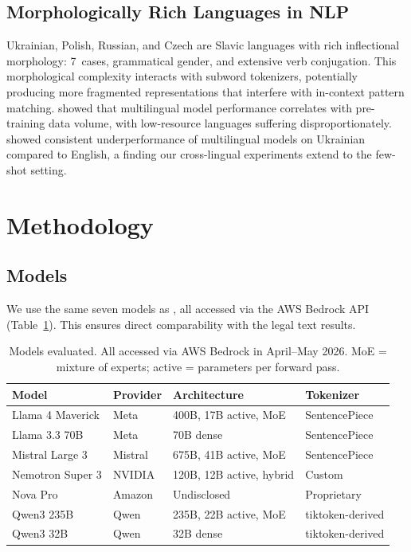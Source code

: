 \documentclass[11pt,a4paper]{article}
\begin{document}
\subsection{Morphologically Rich Languages in NLP}

Ukrainian, Polish, Russian, and Czech are Slavic languages with rich inflectional morphology: 7~cases, grammatical gender, and extensive verb conjugation. This morphological complexity interacts with subword tokenizers, potentially producing more fragmented representations that interfere with in-context pattern matching. \citet{conneau2020unsupervised} showed that multilingual model performance correlates with pre-training data volume, with low-resource languages suffering disproportionately. \citet{chaplynskyi2023ukrbruk} showed consistent underperformance of multilingual models on Ukrainian compared to English, a finding our cross-lingual experiments extend to the few-shot setting.

\section{Methodology}

\subsection{Models}

We use the same seven models as \citet{ovcharov2026tokenizer}, all accessed via the AWS Bedrock API (Table~\ref{tab:models}). This ensures direct comparability with the legal text results.

\begin{table}[t]
\centering
\caption{Models evaluated. All accessed via AWS Bedrock in April--May 2026. MoE = mixture of experts; active = parameters per forward pass.}
\label{tab:models}
\begin{tabular}{llll}
\toprule
\textbf{Model} & \textbf{Provider} & \textbf{Architecture} & \textbf{Tokenizer} \\
\midrule
Llama 4 Maverick   & Meta      & 400B, 17B active, MoE & SentencePiece \\
Llama 3.3 70B      & Meta      & 70B dense              & SentencePiece \\
Mistral Large 3    & Mistral   & 675B, 41B active, MoE  & SentencePiece \\
Nemotron Super 3   & NVIDIA    & 120B, 12B active, hybrid & Custom \\
Nova Pro           & Amazon    & Undisclosed            & Proprietary \\
Qwen3 235B         & Qwen      & 235B, 22B active, MoE  & tiktoken-derived \\
Qwen3 32B          & Qwen      & 32B dense              & tiktoken-derived \\
\bottomrule
\end{tabular}
\end{table}
\end{document}
